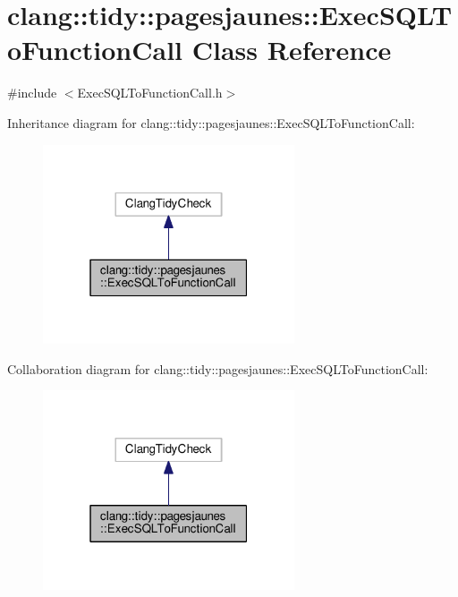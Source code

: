 \hypertarget{classclang_1_1tidy_1_1pagesjaunes_1_1_exec_s_q_l_to_function_call}{}\section{clang\+:\+:tidy\+:\+:pagesjaunes\+:\+:Exec\+S\+Q\+L\+To\+Function\+Call Class Reference}
\label{classclang_1_1tidy_1_1pagesjaunes_1_1_exec_s_q_l_to_function_call}


{\ttfamily \#include $<$Exec\+S\+Q\+L\+To\+Function\+Call.\+h$>$}



Inheritance diagram for clang\+:\+:tidy\+:\+:pagesjaunes\+:\+:Exec\+S\+Q\+L\+To\+Function\+Call\+:
\nopagebreak
\begin{figure}[H]
\begin{center}
\leavevmode
\includegraphics[width=211pt]{classclang_1_1tidy_1_1pagesjaunes_1_1_exec_s_q_l_to_function_call__inherit__graph}
\end{center}
\end{figure}


Collaboration diagram for clang\+:\+:tidy\+:\+:pagesjaunes\+:\+:Exec\+S\+Q\+L\+To\+Function\+Call\+:
\nopagebreak
\begin{figure}[H]
\begin{center}
\leavevmode
\includegraphics[width=211pt]{classclang_1_1tidy_1_1pagesjaunes_1_1_exec_s_q_l_to_function_call__coll__graph}
\end{center}
\end{figure}
